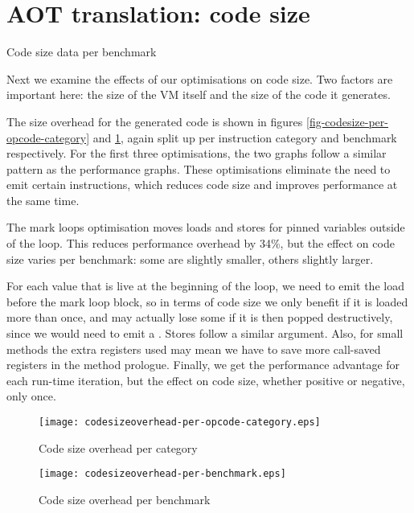 \section{AOT translation: code size}
\label{sec-evaluation-aot-translation-code-size}
\begin{landscape}
\begin{table}[]
 \centering
 \caption{Code size data per benchmark}
 \label{tbl-codesize-per-benchmark}
 \small
 \scriptsize
 \setlength{\tabcolsep}{4pt}
 
 \setlength{\tabcolsep}{6pt}
\end{table}
\end{landscape}


Next we examine the effects of our optimisations on code size. Two factors are important here: the size of the VM itself and the size of the code it generates.

The size overhead for the generated code is shown in figures \ref{fig-codesize-per-opcode-category} and \ref{fig-codesize-per-benchmark}, again split up per instruction category and benchmark respectively. For the first three optimisations, the two graphs follow a similar pattern as the performance graphs. These optimisations eliminate the need to emit certain instructions, which reduces code size and improves performance at the same time.

The mark loops optimisation moves loads and stores for pinned variables outside of the loop. This reduces performance overhead by 34\%, but the effect on code size varies per benchmark: some are slightly smaller, others slightly larger.

For each value that is live at the beginning of the loop, we need to emit the load before the mark loop block, so in terms of code size we only benefit if it is loaded more than once, and may actually lose some if it is then popped destructively, since we would need to emit a . Stores follow a similar argument. Also, for small methods the extra registers used may mean we have to save more call-saved registers in the method prologue. Finally, we get the performance advantage for each run-time iteration, but the effect on code size, whether positive or negative, only once.

\begin{figure}
 \centering
 \begin{minipage}{0.45\textwidth}
  \centering
  \texttt{[image: codesizeoverhead-per-opcode-category.eps]}
  \caption{Code size overhead per category}
  \label{fig-codesize-per-opcode-category}
 \end{minipage}\hfill
 \begin{minipage}{0.45\textwidth}
  \centering
  \texttt{[image: codesizeoverhead-per-benchmark.eps]}
  \caption{Code size overhead per benchmark}
  \label{fig-codesize-per-benchmark}
 \end{minipage}
\end{figure}

